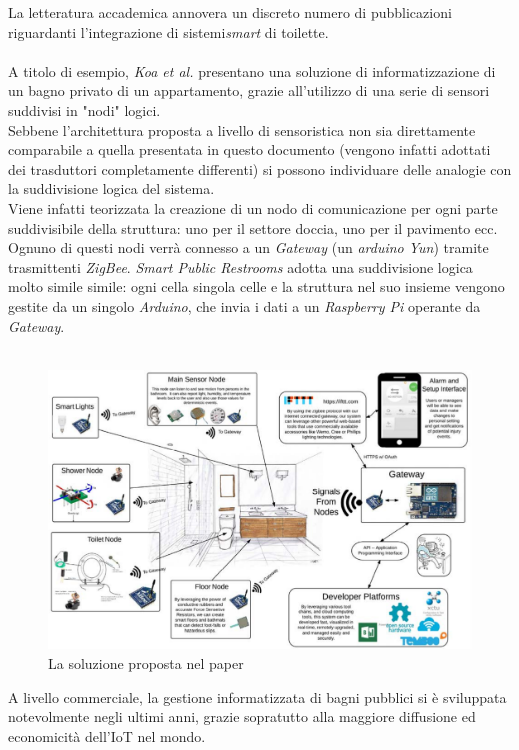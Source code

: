 \documentclass[12pt]{article}
\begin{document}
\newpage

La letteratura accademica annovera un discreto numero di pubblicazioni riguardanti l'integrazione di sistemi\textit{smart} di toilette.\\\\
A titolo di esempio, \textit{Koa et al.}\cite{KooBathroom} presentano una soluzione di informatizzazione di un bagno privato di un appartamento, grazie all'utilizzo di una serie di sensori suddivisi in "nodi" logici.\\
Sebbene l'architettura proposta a livello di sensoristica non sia direttamente comparabile a quella presentata in questo documento (vengono infatti adottati dei trasduttori completamente differenti) si possono individuare delle analogie con la suddivisione logica del sistema.\\
Viene infatti teorizzata la creazione di un nodo di comunicazione per ogni parte suddivisibile della struttura: uno per il settore doccia, uno per il pavimento ecc.
Ognuno di questi nodi verrà connesso a un \textit{Gateway} (un \textit{arduino Yun}) tramite trasmittenti \textit{ZigBee}.
\textit{Smart Public Restrooms} adotta una suddivisione logica molto simile simile: ogni cella singola celle e la struttura nel suo insieme vengono gestite da un singolo \textit{Arduino}, che invia i dati a un \textit{Raspberry Pi} operante da \textit{Gateway}.\\\\
\begin{figure}[h!]
  \includegraphics[scale=0.42]{img/paperbathroom.png}
  \caption{La soluzione proposta nel paper}
  \label{fig:usecase_manager}
\end{figure}
\newpage
A livello commerciale, la gestione informatizzata di bagni pubblici si è sviluppata notevolmente negli ultimi anni, grazie sopratutto alla maggiore diffusione ed economicità dell'IoT nel mondo.\\
\end{document}
